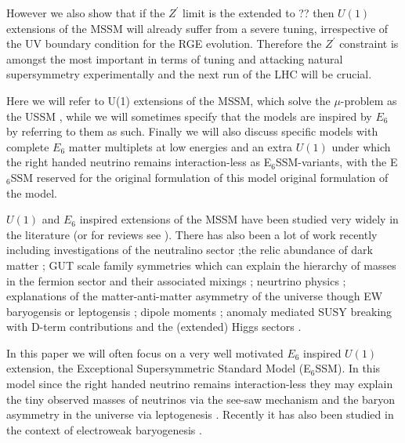 \documentclass[preprint,amsmath,amssymb,aps,superscriptaddress,prd,showpacs,floatfix,nofootinbib]{revtex4-1}
\begin{document}
However we also show that if the $Z^\prime$ limit is the extended to
?? then $U(1)$ extensions of the MSSM will already suffer from a
severe tuning, irrespective of the UV boundary condition for the RGE
evolution.  Therefore the $Z^\prime$ constraint is amongst the most
important in terms of tuning and attacking natural supersymmetry
experimentally and the next run of the LHC will be crucial.



Here we will refer to U(1) extensions of the MSSM, which solve the
$\mu$-problem as the USSM \cite{Cvetic:1995rj, Jain:1995cb,
  Nir:1995bu, Cvetic:1996mf, Cvetic:1997ky}, while we will sometimes
specify that the models are inspired by $E_6$ by referring to them as
such. Finally we will also discuss specific models with complete $E_6$
matter multiplets at low energies and an extra $U(1)$ under which the
right handed neutrino remains interaction-less as
E$_6$SSM-variants\cite{Howl:2007zi, Braam:2009fi, Braam:2010sy,
  Hall:2011zq, Nevzorov:2012hs, Athron:2014pua}, with the E$_6$SSM
reserved for the original formulation of this model
\cite{King:2005jy,King:2005my,Athron:2010zz} original formulation of
the model.
 
$U(1)$ and $E_6$ inspired extensions of the MSSM have been studied
very widely in the literature \cite{Gunion:1989we, Gunion:1992hs,
  Binetruy:1985xm, Ellis:1986yg, Ibanez:1986si, Gunion:1986ky,
  Haber:1986gz, Baer:1987eb, Gunion:1987jd, Grifols:1986vr,
  Ellis:1986ip, Morris:1987fm, Drees:1987tp, Ma:1995xk,
  Suematsu:1997tv, Suematsu:1997qt, Suematsu:1997au, Keith:1996fv,
  Keith:1997zb, Gherghetta:1996yr, Demir:1998dk, Langacker:1998tc,
  Hambye:2000bn, Ma:2000jf} (or for reviews see
\cite{Hewett:1988xc,Langacker:2008yv}).  There has also been a lot of
work recently including investigations of the neutralino sector
\cite{Hesselbach:2001ri, Barger:2005hb, Choi:2006fz,
  Barger:2007nv};the relic abundance of dark matter
\cite{Kalinowski:2008iq}; GUT scale family symmetries which can
explain the hierarchy of masses in the fermion sector and their
associated mixings \cite{Stech:2008wd}; neurtrino physics
\cite{Kang:2004ix}; explanations of the matter-anti-matter asymmetry
of the universe though EW baryogensis or leptogensis
\cite{Hambye:2000bn,Ma:2000jf,Kang:2004pp}; dipole moments
\cite{GutierrezRodriguez:2006hb}; anomaly mediated SUSY breaking with
D-term contributions \cite{Asano:2008ju} and the (extended) Higgs
sectors \cite{Daikoku:2000ep,Ham:2008xf}.


In this paper we will often focus on a very well motivated $E_6$
inspired $U(1)$ extension, the Exceptional Supersymmetric Standard
Model (E$_6$SSM)\cite{King:2005jy,King:2005my,Athron:2010zz}.  In this
model since the right handed neutrino remains interaction-less they
may explain the tiny observed masses of neutrinos via the see-saw
mechanism and the baryon asymmetry in the universe via leptogenesis
\cite{Hambye:2000bn,King:2008qb, King:2008gw}.  Recently it has also
been studied in the context of electroweak baryogenesis
\cite{Chao:2014hya}.
\end{document}
